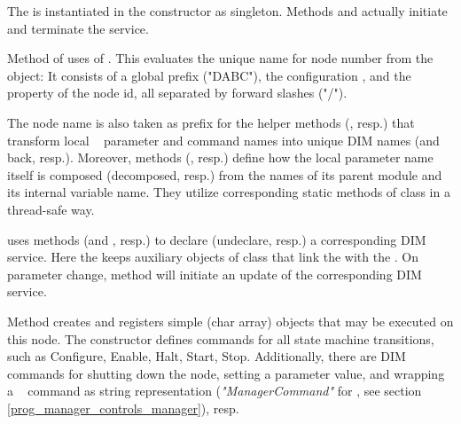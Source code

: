 \begin{compactenum}

\item The  is instantiated in the constructor as	 
singleton. Methods  and  
actually initiate and terminate the service. 

\item {}
Method  of  
uses  of .
This evaluates the unique name for node number  
from the  object: It consists of
a global prefix ("DABC"), the configuration , and the
 property of the node id,
all separated by forward slashes ("/").

The node name is also taken as prefix for the helper
methods  (, resp.) that 
transform local \dabc~ parameter and command names 
into unique DIM names (and back, resp.). 
Moreover, methods 
(, resp.) define how
the local parameter name itself is composed (decomposed, resp.) from the names
of its parent module and its internal variable name. They
utilize corresponding static methods of class 
in a thread-safe way.

     
\item {} 
uses methods  (and
, resp.) to declare (undeclare, resp.) 
a corresponding DIM service. Here the 
keeps auxiliary objects of class 
 that link the  with the . On parameter change, method 
 will initiate an update of the corresponding DIM
service.
    
\item {} Method  
creates and registers simple (char array)  objects
that may be executed on this node. The  constructor
defines commands for all state machine transitions, 
such as Configure, Enable, Halt, Start, Stop. Additionally, there are DIM commands for
shutting down the node, setting a parameter value, and
wrapping a \dabc~ 
command as string representation ({\em "ManagerCommand"} for ,
see section \ref{prog_manager_controls_manager}), resp.


\end{compactenum}
